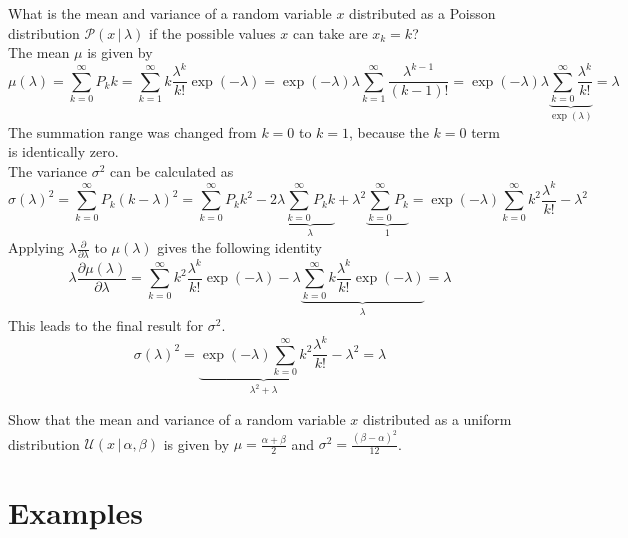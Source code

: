 \documentclass{tstextbook}
\begin{document}
\begin{example}
What is the mean and variance of a random variable $x$ distributed as a Poisson distribution $\mathcal{P}\left(x\,\vert\,\lambda\right)$ if the possible values $x$ can take are $x_k=k$?\\
The mean $\mu$ is given by 
  \begin{equation}
    \mu(\lambda)=\sum_{k=0}^{\infty}P_k k=\sum_{k=1}^{\infty}k\frac{\lambda^k}{k!}\exp(-\lambda) =\exp(-\lambda)\lambda\sum_{k=1}^{\infty}\frac{\lambda^{k-1}}{(k-1)!}=\exp(-\lambda)\lambda\underbrace{\sum_{k=0}^{\infty}\frac{\lambda^{k}}{k!}}_{\exp(\lambda)}=\lambda
  \end{equation}
The summation range was changed from $k=0$ to $k=1$, because the $k=0$ term is identically zero.\\
The variance $\sigma^2$ can be calculated as 
  \begin{equation}
    \sigma(\lambda)^2=\sum_{k=0}^{\infty}P_k (k-\lambda)^2=\sum_{k=0}^{\infty}P_k k^2 - 2\lambda \underbrace{\sum_{k=0}^{\infty}P_k k}_{\lambda} + \lambda^2\underbrace{\sum_{k=0}^{\infty}P_k}_{1}=
\exp(-\lambda)\sum_{k=0}^{\infty}k^2\frac{\lambda^k}{k!} - \lambda^2
  \end{equation}
Applying $\lambda\frac{\partial}{\partial \lambda}$ to $\mu(\lambda)$ gives the following identity
\begin{equation}
\lambda\frac{\partial \mu(\lambda)}{\partial \lambda}=\sum_{k=0}^{\infty}k^2\frac{\lambda^k}{k!}\exp(-\lambda)-\lambda\underbrace{\sum_{k=0}^{\infty}k\frac{\lambda^k}{k!}\exp(-\lambda)}_{\lambda}=\lambda
\end{equation}  
This leads to the final result for $\sigma^2$.
  \begin{equation}
    \sigma(\lambda)^2=\underbrace{\exp(-\lambda)\sum_{k=0}^{\infty}k^2\frac{\lambda^k}{k!}}_{\lambda^2+\lambda} - \lambda^2=\lambda
  \end{equation}  
\end{example}

\begin{exercise}
 Show that the mean and variance of a random variable $x$ distributed as a uniform distribution $\mathcal{U}\left(x\,\vert\,\alpha,\beta\right)$ is given by $\mu=\frac{\alpha+\beta}{2}$ and $\sigma^2=\frac{(\beta-\alpha)^2}{12}$.
\end{exercise}

\section{Examples}
\end{document}
